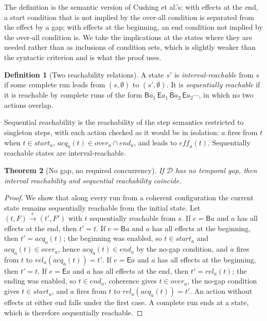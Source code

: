 \documentclass[preprint,12pt]{elsarticle}
\theoremstyle{plain}
\newtheorem{theorem}{Theorem}[section]
\theoremstyle{definition}
\newtheorem{definition}[theorem]{Definition}
\newcommand{\st}{\mathit{start}}
\newcommand{\ovr}{\mathit{over}}
\newcommand{\stp}{\mathit{end}}
\newcommand{\eff}{\mathit{eff}}
\newcommand{\acq}{\mathit{acq}}
\newcommand{\rel}{\mathit{rel}}
\newcommand{\B}[1]{\mathsf{B}#1}
\newcommand{\E}[1]{\mathsf{E}#1}
\newcommand{\istep}[1]{\xrightarrow{#1}}
\newcommand{\D}{\mathcal{D}}
\begin{document}
The definition is the semantic version of Cushing et al.'s: with effects at the end, a start condition that is not implied by the over-all condition is separated from the effect by a gap; with effects at the beginning, an end condition not implied by the over-all condition is. We take the implications at the states where they are needed rather than as inclusions of condition sets, which is slightly weaker than the syntactic criterion and is what the proof uses.

\begin{definition}[Two reachability relations]
A state $s'$ is \emph{interval-reachable} from $s$ if some complete run leads from $(s, \emptyset)$ to $(s', \emptyset)$. It is \emph{sequentially reachable} if it is reachable by complete runs of the form $\B{a_1}\,\E{a_1}\, \B{a_2}\,\E{a_2} \cdots$, in which no two actions overlap.
\end{definition}

Sequential reachability is the reachability of the step semantics restricted to singleton steps, with each action checked as it would be in isolation: $a$ fires from $t$ when $t \in \st_a$, $\acq_a(t) \in \ovr_a \cap \stp_a$, and leads to $\eff_a(t)$. Sequentially reachable states are interval-reachable.

\begin{theorem}[No gap, no required concurrency]
\label{thm:nogap}
If $\D$ has no temporal gap, then interval reachability and sequential reachability coincide.
\end{theorem}

\begin{proof}
We show that along every run from a coherent configuration the current state remains sequentially reachable from the initial state. Let $(t, F) \istep{e} (t', F')$ with $t$ sequentially reachable from $s$. If $e = \B{a}$ and $a$ has all effects at the end, then $t' = t$. If $e = \B{a}$ and $a$ has all effects at the beginning, then $t' = \acq_a(t)$; the beginning was enabled, so $t \in \st_a$ and $\acq_a(t) \in \ovr_a$, hence $\acq_a(t) \in \stp_a$ by the no-gap condition, and $a$ fires from $t$ to $\rel_a(\acq_a(t)) = t'$. If $e = \E{a}$ and $a$ has all effects at the beginning, then $t' = t$. If $e = \E{a}$ and $a$ has all effects at the end, then $t' = \rel_a(t)$; the ending was enabled, so $t \in \stp_a$, coherence gives $t \in \ovr_a$, the no-gap condition gives $t \in \st_a$, and $a$ fires from $t$ to $\rel_a(\acq_a(t)) = t'$. An action without effects at either end falls under the first case. A complete run ends at a state, which is therefore sequentially reachable.
\end{proof}
\end{document}

